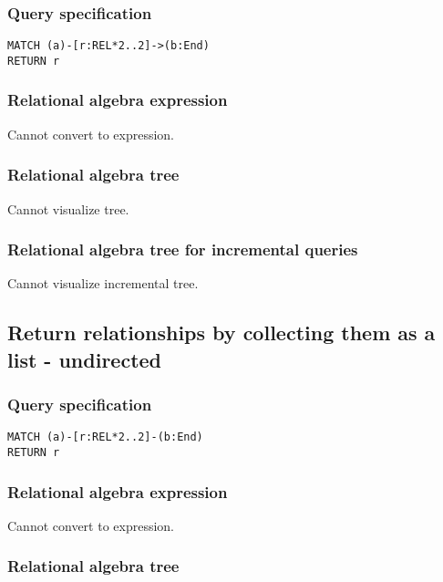 \subsubsection*{Query specification}

\begin{lstlisting}
MATCH (a)-[r:REL*2..2]->(b:End)
RETURN r
\end{lstlisting}

\subsubsection*{Relational algebra expression}

Cannot convert to expression.

\subsubsection*{Relational algebra tree}

Cannot visualize tree.

\subsubsection*{Relational algebra tree for incremental queries}

Cannot visualize incremental tree.

\subsection{Return relationships by collecting them as a list - undirected}

\subsubsection*{Query specification}

\begin{lstlisting}
MATCH (a)-[r:REL*2..2]-(b:End)
RETURN r
\end{lstlisting}

\subsubsection*{Relational algebra expression}

Cannot convert to expression.

\subsubsection*{Relational algebra tree}

